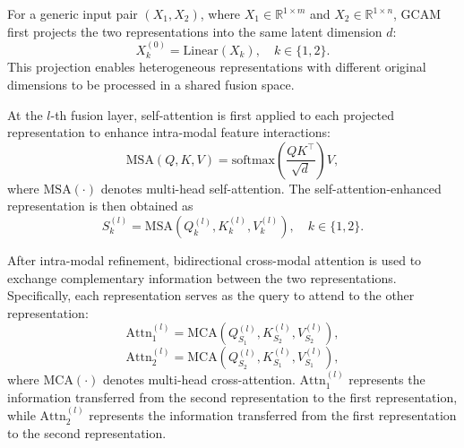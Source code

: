 \documentclass[a4paper,fleqn]{cas-dc}
\begin{document}
For a generic input pair $(X_1, X_2)$, where $X_1 \in \mathbb{R}^{1\times m}$ and $X_2 \in \mathbb{R}^{1\times n}$, GCAM first projects the two representations into the same latent dimension $d$:
\begin{equation}
X_k^{(0)} = \mathrm{Linear}(X_k), \quad k \in \{1,2\}.
\end{equation}
This projection enables heterogeneous representations with different original dimensions to be processed in a shared fusion space.

At the $l$-th fusion layer, self-attention is first applied to each projected representation to enhance intra-modal feature interactions:
\begin{equation}
\mathrm{MSA}(Q,K,V)=
\mathrm{softmax}
\left(
\frac{QK^{\top}}{\sqrt{d}}
\right)V,
\end{equation}
where $\mathrm{MSA}(\cdot)$ denotes multi-head self-attention. The self-attention-enhanced representation is then obtained as
\begin{equation}
S_k^{(l)}=
\mathrm{MSA}
\left(
Q_k^{(l)},K_k^{(l)},V_k^{(l)}
\right),
\quad k\in\{1,2\}.
\end{equation}

After intra-modal refinement, bidirectional cross-modal attention is used to exchange complementary information between the two representations. Specifically, each representation serves as the query to attend to the other representation:
\begin{equation}
\mathrm{Attn}_1^{(l)}
=
\mathrm{MCA}
\left(
Q_{S_1}^{(l)},
K_{S_2}^{(l)},
V_{S_2}^{(l)}
\right),
\end{equation}
\vspace{-2em}
\begin{equation}
\mathrm{Attn}_2^{(l)}
=
\mathrm{MCA}
\left(
Q_{S_2}^{(l)},
K_{S_1}^{(l)},
V_{S_1}^{(l)}
\right),
\end{equation}
where $\mathrm{MCA}(\cdot)$ denotes multi-head cross-attention. $\mathrm{Attn}_1^{(l)}$ represents the information transferred from the second representation to the first representation, while $\mathrm{Attn}_2^{(l)}$ represents the information transferred from the first representation to the second representation.
\end{document}
